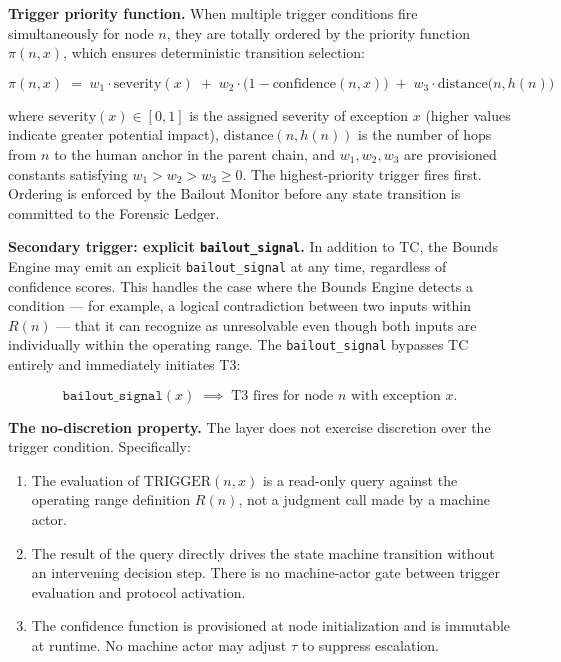 \bigskip
\noindent\textbf{Trigger priority function.} When multiple trigger conditions fire simultaneously for node $n$, they are totally ordered by the priority function $\pi(n, x)$, which ensures deterministic transition selection:

\begin{equation}
\pi(n, x) \;=\; w_1 \cdot \text{severity}(x) \;+\; w_2 \cdot \bigl(1 - \text{confidence}(n, x)\bigr) \;+\; w_3 \cdot \text{distance}\bigl(n, h(n)\bigr) \tag{PF}
\end{equation}

where $\text{severity}(x) \in [0, 1]$ is the assigned severity of exception $x$ (higher values indicate greater potential impact), $\text{distance}(n, h(n))$ is the number of hops from $n$ to the human anchor in the parent chain, and $w_1, w_2, w_3$ are provisioned constants satisfying $w_1 > w_2 > w_3 \geq 0$. The highest-priority trigger fires first. Ordering is enforced by the Bailout Monitor before any state transition is committed to the Forensic Ledger.

\bigskip
\noindent\textbf{Secondary trigger: explicit \texttt{bailout\_signal}.} In addition to TC, the Bounds Engine may emit an explicit \texttt{bailout\_signal} at any time, regardless of confidence scores. This handles the case where the Bounds Engine detects a condition — for example, a logical contradiction between two inputs within $R(n)$ — that it can recognize as unresolvable even though both inputs are individually within the operating range. The \texttt{bailout\_signal} bypasses TC entirely and immediately initiates T3:

\begin{equation}
\texttt{bailout\_signal}(x) \;\implies\; \text{T3 fires for node } n \text{ with exception } x. \tag{TC-secondary}
\end{equation}

\bigskip
\noindent\textbf{The no-discretion property.} The \bounds{} layer does not exercise discretion over the trigger condition. Specifically:

\begin{enumerate}
    \item The evaluation of $\text{TRIGGER}(n, x)$ is a read-only query against the operating range definition $R(n)$, not a judgment call made by a machine actor.
    \item The result of the query directly drives the state machine transition without an intervening decision step. There is no machine-actor gate between trigger evaluation and protocol activation.
    \item The confidence function is provisioned at node initialization and is immutable at runtime. No machine actor may adjust $\tau$ to suppress escalation.
\end{enumerate}


